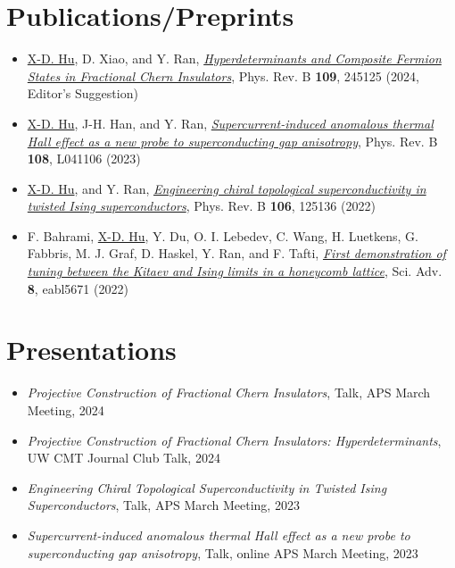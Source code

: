 \documentclass[10pt, letterpaper]{article}
\begin{document}
\section*{Publications/Preprints}
\begin{itemize}
    \item \underline{X-D. Hu}, D. Xiao, and Y. Ran, \href{https://journals.aps.org/prb/abstract/10.1103/PhysRevB.109.245125}{\emph{Hyperdeterminants and Composite Fermion States in Fractional Chern Insulators}},  Phys. Rev. B \textbf{109}, 245125 (2024, Editor's Suggestion)
    \item \underline{X-D. Hu}, J-H. Han, and Y. Ran, \href{https://journals.aps.org/prb/abstract/10.1103/PhysRevB.108.L041106}{\emph{Supercurrent-induced anomalous thermal Hall effect as a new probe to superconducting gap anisotropy}}, Phys. Rev. B \textbf{108}, L041106 (2023)
    \item \underline{X-D. Hu}, and Y. Ran, \href{https://journals.aps.org/prb/abstract/10.1103/PhysRevB.106.125136}{\emph{Engineering chiral topological superconductivity in twisted Ising superconductors}}, Phys. Rev. B \textbf{106}, 125136 (2022)
    \item F. Bahrami, \underline{X-D. Hu}, Y. Du, O. I. Lebedev, C. Wang, H. Luetkens, G. Fabbris, M. J. Graf, D. Haskel, Y. Ran, and F. Tafti, \href{https://www.science.org/doi/full/10.1126/sciadv.abl5671}{\emph{First demonstration of tuning between the Kitaev and Ising limits in a honeycomb lattice}}, Sci. Adv. \textbf{8}, eabl5671 (2022)
\end{itemize}


\section*{Presentations}
\begin{itemize}
    \item \emph{Projective Construction of Fractional Chern Insulators}, Talk, APS March Meeting, 2024
    \item \emph{Projective Construction of Fractional Chern Insulators: Hyperdeterminants}, UW CMT Journal Club Talk, 2024
    \item \emph{Engineering Chiral Topological Superconductivity in Twisted Ising Superconductors}, Talk, APS March Meeting, 2023
    \item \emph{Supercurrent-induced anomalous thermal Hall effect as a new probe to superconducting gap anisotropy}, Talk, online APS March Meeting, 2023
\end{itemize}
\end{document}
